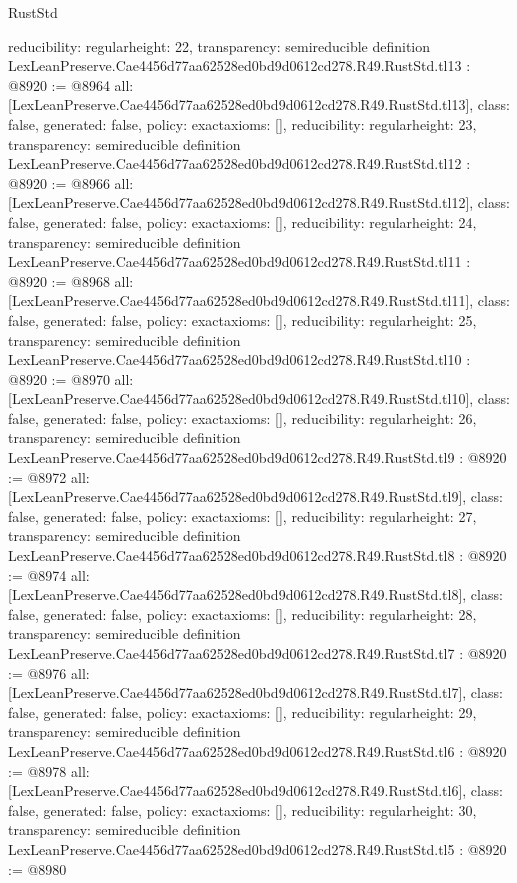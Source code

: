\begin{lexlean}{RustStd}
\begin{coremodule}
{  reducibility: regular{height: 22},
  transparency: semireducible
}
definition LexLeanPreserve.Cae4456d77aa62528ed0bd9d0612cd278.R49.RustStd.tl13 : @8920 := @8964 {
  all: [LexLeanPreserve.Cae4456d77aa62528ed0bd9d0612cd278.R49.RustStd.tl13],
  class: false,
  generated: false,
  policy: exact{axioms: []},
  reducibility: regular{height: 23},
  transparency: semireducible
}
definition LexLeanPreserve.Cae4456d77aa62528ed0bd9d0612cd278.R49.RustStd.tl12 : @8920 := @8966 {
  all: [LexLeanPreserve.Cae4456d77aa62528ed0bd9d0612cd278.R49.RustStd.tl12],
  class: false,
  generated: false,
  policy: exact{axioms: []},
  reducibility: regular{height: 24},
  transparency: semireducible
}
definition LexLeanPreserve.Cae4456d77aa62528ed0bd9d0612cd278.R49.RustStd.tl11 : @8920 := @8968 {
  all: [LexLeanPreserve.Cae4456d77aa62528ed0bd9d0612cd278.R49.RustStd.tl11],
  class: false,
  generated: false,
  policy: exact{axioms: []},
  reducibility: regular{height: 25},
  transparency: semireducible
}
definition LexLeanPreserve.Cae4456d77aa62528ed0bd9d0612cd278.R49.RustStd.tl10 : @8920 := @8970 {
  all: [LexLeanPreserve.Cae4456d77aa62528ed0bd9d0612cd278.R49.RustStd.tl10],
  class: false,
  generated: false,
  policy: exact{axioms: []},
  reducibility: regular{height: 26},
  transparency: semireducible
}
definition LexLeanPreserve.Cae4456d77aa62528ed0bd9d0612cd278.R49.RustStd.tl9 : @8920 := @8972 {
  all: [LexLeanPreserve.Cae4456d77aa62528ed0bd9d0612cd278.R49.RustStd.tl9],
  class: false,
  generated: false,
  policy: exact{axioms: []},
  reducibility: regular{height: 27},
  transparency: semireducible
}
definition LexLeanPreserve.Cae4456d77aa62528ed0bd9d0612cd278.R49.RustStd.tl8 : @8920 := @8974 {
  all: [LexLeanPreserve.Cae4456d77aa62528ed0bd9d0612cd278.R49.RustStd.tl8],
  class: false,
  generated: false,
  policy: exact{axioms: []},
  reducibility: regular{height: 28},
  transparency: semireducible
}
definition LexLeanPreserve.Cae4456d77aa62528ed0bd9d0612cd278.R49.RustStd.tl7 : @8920 := @8976 {
  all: [LexLeanPreserve.Cae4456d77aa62528ed0bd9d0612cd278.R49.RustStd.tl7],
  class: false,
  generated: false,
  policy: exact{axioms: []},
  reducibility: regular{height: 29},
  transparency: semireducible
}
definition LexLeanPreserve.Cae4456d77aa62528ed0bd9d0612cd278.R49.RustStd.tl6 : @8920 := @8978 {
  all: [LexLeanPreserve.Cae4456d77aa62528ed0bd9d0612cd278.R49.RustStd.tl6],
  class: false,
  generated: false,
  policy: exact{axioms: []},
  reducibility: regular{height: 30},
  transparency: semireducible
}
definition LexLeanPreserve.Cae4456d77aa62528ed0bd9d0612cd278.R49.RustStd.tl5 : @8920 := @8980 {
}
\end{coremodule}
\end{lexlean}
